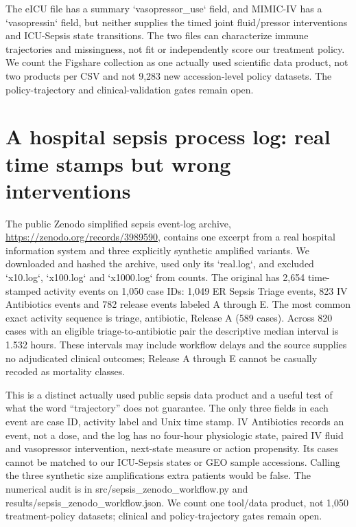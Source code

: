 The eICU file has a summary `vasopressor\_use` field, and MIMIC-IV has a `vasopressin` field, but neither supplies the timed joint fluid/pressor interventions and ICU-Sepsis state transitions. The two files can characterize immune trajectories and missingness, not fit or independently score our treatment policy. We count the Figshare collection as one actually used scientific data product, not two products per CSV and not 9,283 new accession-level policy datasets. The policy-trajectory and clinical-validation gates remain open.

\section{A hospital sepsis process log: real time stamps but wrong interventions}
The public Zenodo simplified sepsis event-log archive, \url{https://zenodo.org/records/3989590}, contains one excerpt from a real hospital information system and three explicitly synthetic amplified variants. We downloaded and hashed the archive, used only its `real.log`, and excluded `x10.log`, `x100.log` and `x1000.log` from counts. The original has 2,654 time-stamped activity events on 1,050 case IDs: 1,049 ER Sepsis Triage events, 823 IV Antibiotics events and 782 release events labeled A through E. The most common exact activity sequence is triage, antibiotic, Release A (589 cases). Across 820 cases with an eligible triage-to-antibiotic pair the descriptive median interval is 1.532 hours. These intervals may include workflow delays and the source supplies no adjudicated clinical outcomes; Release A through E cannot be casually recoded as mortality classes.

This is a distinct actually used public sepsis data product and a useful test of what the word ``trajectory'' does not guarantee. The only three fields in each event are case ID, activity label and Unix time stamp. IV Antibiotics records an event, not a dose, and the log has no four-hour physiologic state, paired IV fluid and vasopressor intervention, next-state measure or action propensity. Its cases cannot be matched to our ICU-Sepsis states or GEO sample accessions. Calling the three synthetic size amplifications extra patients would be false. The numerical audit is in src/sepsis\_zenodo\_workflow.py and results/sepsis\_zenodo\_workflow.json. We count one tool/data product, not 1,050 treatment-policy datasets; clinical and policy-trajectory gates remain open.

